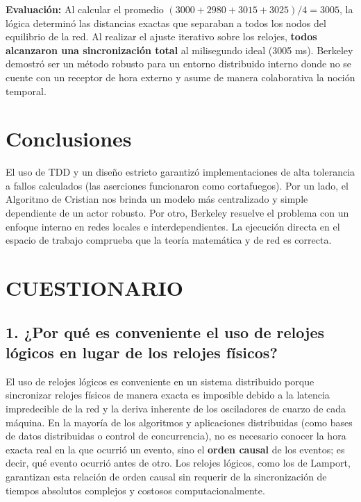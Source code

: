 \documentclass{article}
\begin{document}
\textbf{Evaluación:}
Al calcular el promedio $(3000 + 2980 + 3015 + 3025) / 4 = 3005$, la lógica determinó las distancias exactas que separaban a todos los nodos del equilibrio de la red. Al realizar el ajuste iterativo sobre los relojes, \textbf{todos alcanzaron una sincronización total} al milisegundo ideal (3005 ms). Berkeley demostró ser un método robusto para un entorno distribuido interno donde no se cuente con un receptor de hora externo y asume de manera colaborativa la noción temporal.

\section{Conclusiones}
El uso de TDD y un diseño estricto garantizó implementaciones de alta tolerancia a fallos calculados (las aserciones funcionaron como cortafuegos). Por un lado, el Algoritmo de Cristian nos brinda un modelo más centralizado y simple dependiente de un actor robusto. Por otro, Berkeley resuelve el problema con un enfoque interno en redes locales e interdependientes. La ejecución directa en el espacio de trabajo comprueba que la teoría matemática y de red es correcta.


\clearpage

\section{CUESTIONARIO}

\subsection{1. ¿Por qué es conveniente el uso de relojes lógicos en lugar de los relojes físicos?}
El uso de relojes lógicos es conveniente en un sistema distribuido porque sincronizar relojes físicos de manera exacta es imposible debido a la latencia impredecible de la red y la deriva inherente de los osciladores de cuarzo de cada máquina. En la mayoría de los algoritmos y aplicaciones distribuidas (como bases de datos distribuidas o control de concurrencia), no es necesario conocer la hora exacta real en la que ocurrió un evento, sino el \textbf{orden causal} de los eventos; es decir, qué evento ocurrió antes de otro. Los relojes lógicos, como los de Lamport, garantizan esta relación de orden causal sin requerir de la sincronización de tiempos absolutos complejos y costosos computacionalmente.
\end{document}
